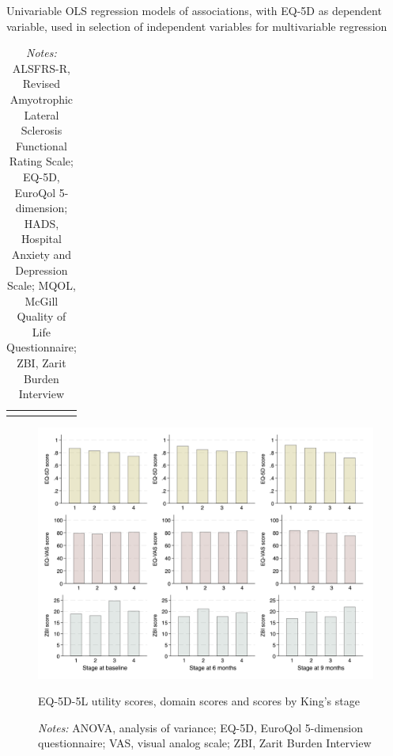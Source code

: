 \documentclass[12pt]{article}
\begin{document}
\begin{table}[H]
    \centering \singlespacing \small
    \caption{Univariable OLS regression models of associations, with EQ-5D as dependent variable, used in selection of independent variables for multivariable regression}
    \begin{tabular}{|L{6cm}|C{2cm}|C{3cm}|C{2cm}|}
        \hline
    \end{tabular}
    \label{tab_univarReg_eq5d}
    \caption*{\footnotesize 
                \textit{Notes:} ALSFRS-R, Revised Amyotrophic Lateral Sclerosis Functional Rating Scale; EQ-5D, EuroQol 5-dimension; HADS, Hospital Anxiety and Depression Scale; MQOL, McGill Quality of Life Questionnaire; ZBI, Zarit Burden Interview}
\end{table}


\begin{figure}[H]
    \centering
    \includegraphics[width=1\linewidth]{figures/outcome-kings-stage.png}
    \caption{EQ-5D-5L utility scores, domain scores and scores by King’s stage}
    \label{fig:outcome-kings-stage}
    \caption*{\footnotesize \textit{Notes:} ANOVA, analysis of variance; EQ-5D, EuroQol 5-dimension questionnaire; VAS, visual analog scale; ZBI, Zarit Burden Interview}
\end{figure}
\end{document}
